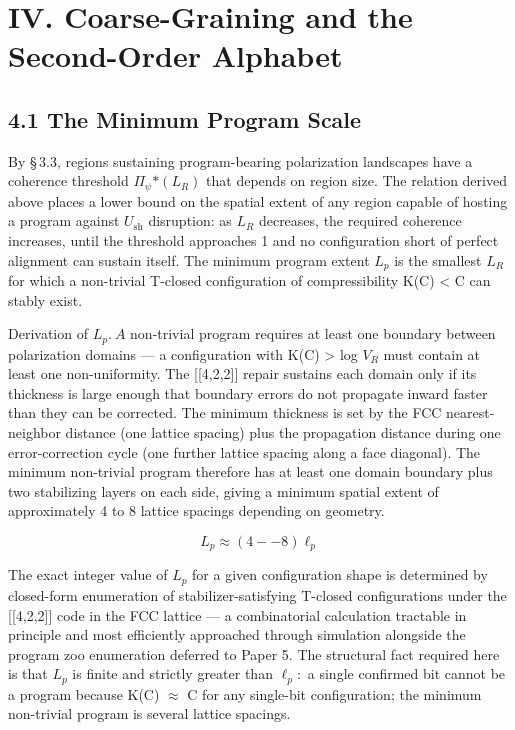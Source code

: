 \documentclass[11pt,oneside]{report}
\theoremstyle{definition}
\theoremstyle{remark}
\begin{document}
\section*{IV. Coarse-Graining and the Second-Order Alphabet}

\subsection*{4.1 The Minimum Program Scale}

By \S\,3.3, regions sustaining program-bearing polarization landscapes have
a coherence threshold \textbar \ensuremath{\Pi_{\psi}}\textbar\ensuremath{*(L_{R})} that depends on
region size. The relation derived above places a lower bound on the
spatial extent of any region capable of hosting a program against \ensuremath{U_{\mathrm{sh}}}
disruption: as \ensuremath{L_{R}} decreases, the required coherence increases, until
the threshold approaches 1 and no configuration short of perfect
alignment can sustain itself. The minimum program extent \ensuremath{L_{p}} is the
smallest \ensuremath{L_{R}} for which a non-trivial T-closed configuration of
compressibility K(C) \textless{} \textbar C\textbar{} can stably exist.

Derivation of \ensuremath{L_{p}.~A} non-trivial program requires at least one boundary
between polarization domains --- a configuration with K(C)
\textgreater{} log \ensuremath{V_{R}} must contain at least one non-uniformity. The
[[4,2,2]] repair sustains each domain only if its thickness is
large enough that boundary errors do not propagate inward faster than
they can be corrected. The minimum thickness is set by the FCC
nearest-neighbor distance (one lattice spacing) plus the propagation
distance during one error-correction cycle (one further lattice spacing
along a face diagonal). The minimum non-trivial program therefore has at
least one domain boundary plus two stabilizing layers on each side,
giving a minimum spatial extent of approximately 4 to 8 lattice spacings
depending on geometry.

\begin{equation*}
L_{p} \approx (4--8) \ell_{p}
\end{equation*}

The exact integer value of \ensuremath{L_{p}} for a given configuration shape is
determined by closed-form enumeration of stabilizer-satisfying T-closed
configurations under the [[4,2,2]] code in the FCC lattice --- a
combinatorial calculation tractable in principle and most efficiently
approached through simulation alongside the program zoo enumeration
deferred to Paper 5. The structural fact required here is that \ensuremath{L_{p}} is
finite and strictly greater than \ensuremath{\ell_{p}:} a single confirmed bit cannot be a
program because K(C) \ensuremath{\approx} \textbar C\textbar{} for any single-bit
configuration; the minimum non-trivial program is several lattice
spacings.
\end{document}
